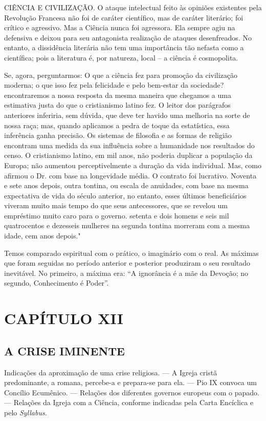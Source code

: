 \documentclass[11pt,a5paper,twoside,openany]{book}
\begin{document}
CIÊNCIA E CIVILIZAÇÃO. O ataque intelectual feito às opiniões existentes pela Revolução Francesa não foi de caráter científico, mas de caráter literário; foi crítico e agressivo. Mas a Ciência nunca foi agressora. Ela sempre agiu na defensiva e deixou para seu antagonista realização de ataques desenfreados. No entanto, a dissidência literária não tem uma importância tão nefasta como a científica; pois a literatura é, por natureza, local – a ciência é cosmopolita.

Se, agora, perguntarmos: O que a ciência fez para promoção da civilização moderna; o que isso fez pela felicidade e pelo bem-estar da sociedade? encontraremos a nossa resposta da mesma maneira que chegamos a uma estimativa justa do que o cristianismo latino fez. O leitor dos parágrafos anteriores inferiria, sem dúvida, que deve ter havido uma melhoria na sorte de nossa raça; mas, quando aplicamos a pedra de toque da estatística, essa inferência ganha precisão. Os sistemas de filosofia e as formas de religião encontram uma medida da sua influência sobre a humanidade nos resultados do censo. O cristianismo latino, em mil anos, não poderia duplicar a população da Europa; não aumentou perceptivelmente a duração da vida individual. Mas, como afirmou o Dr. com base na longevidade média. O contrato foi lucrativo. Noventa e sete anos depois, outra tontina, ou escala de anuidades, com base na mesma expectativa de vida do século anterior, no entanto, esses últimos beneficiários viveram muito mais tempo do que seus antecessores, que se revelou um empréstimo muito caro para o governo. setenta e dois homens e seis mil quatrocentos e dezesseis mulheres na segunda tontina morreram com a mesma idade, cem anos depois."

Temos comparado espiritual com o prático, o imaginário com o real. As máximas que foram seguidas no período anterior e posterior produziram o seu resultado inevitável. No primeiro, a máxima era: “A ignorância é a mãe da Devoção; no segundo, Conhecimento é Poder”.

\clearpage
\chapter*{CAPÍTULO XII}
\section*{A CRISE IMINENTE}
Indicações da aproximação de uma crise religiosa. — A Igreja cristã predominante, a romana, percebe-a e prepara-se para ela. — Pio IX convoca um Concílio Ecumênico. — Relações dos diferentes governos europeus com o papado. — Relações da Igreja com a Ciência, conforme indicadas pela Carta Encíclica e pelo \textit{Syllabus}.
\end{document}
